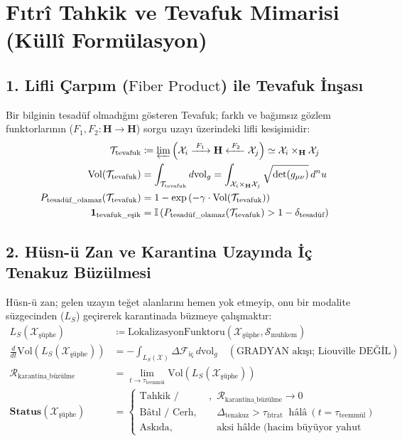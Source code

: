 \documentclass[11pt, a4paper]{article}
\begin{document}
\section{Fıtrî Tahkik ve Tevafuk Mimarisi (Küllî Formülasyon)}

\subsection{1. Lifli Çarpım ($\text{Fiber Product}$) ile Tevafuk İnşası}
Bir bilginin tesadüf olmadığını gösteren Tevafuk; farklı ve bağımsız gözlem funktorlarının ($F_1, F_2 : \mathbf{H} \to \mathbf{H}$) sorgu uzayı üzerindeki lifli kesişimidir:
\begin{align}
\mathcal{T}_{\text{tevafuk}} &\coloneqq \varprojlim \left( \mathcal{X}_i \xrightarrow{\;F_1\;} \mathbf{H} \xleftarrow{\;F_2\;} \mathcal{X}_j \right) \simeq \mathcal{X}_i \times_{\mathbf{H}} \mathcal{X}_j \\
\text{Vol}(\mathcal{T}_{\text{tevafuk}}) &= \int_{\mathcal{T}_{\text{tevafuk}}} d\text{vol}_g = \int_{\mathcal{X}_i \times_{\mathbf{H}} \mathcal{X}_j} \sqrt{\det(g_{\mu\nu})} \, d^n u \\
P_{\text{tesadüf\_olamaz}}(\mathcal{T}_{\text{tevafuk}}) &= 1 - \exp\left( -\gamma \cdot \text{Vol}(\mathcal{T}_{\text{tevafuk}}) \right) \\
\mathbf{1}_{\text{tevafuk\_eşik}} &= \mathbb{I}\left( P_{\text{tesadüf\_olamaz}}(\mathcal{T}_{\text{tevafuk}}) > 1 - \delta_{\text{tesadüf}} \right)
\end{align}

\subsection{2. Hüsn-ü Zan ve Karantina Uzayında İç Tenakuz Büzülmesi}
Hüsn-ü zan; gelen uzayın teğet alanlarını hemen yok etmeyip, onu bir modalite süzgecinden ($L_S$) geçirerek karantinada büzmeye çalışmaktır:
\begin{align}
L_S(\mathcal{X}_{\text{şüphe}}) &\coloneqq \text{LokalizasyonFunktoru}(\mathcal{X}_{\text{şüphe}}, \mathcal{S}_{\text{muhkem}}) \\
\frac{d}{dt} \text{Vol}(L_S(\mathcal{X}_{\text{şüphe}})) &= -\int_{L_S(\mathcal{X})} \Delta \mathcal{F}_{\text{iç}} \, d\text{vol}_g \quad (\text{GRADYAN akışı; Liouville DEĞİL}) \\
\mathcal{R}_{\text{karantina\_büzülme}} &= \lim_{t \to \tau_{\text{teemmül}}} \text{Vol}(L_S(\mathcal{X}_{\text{şüphe}})) \\
\mathbf{Status}(\mathcal{X}_{\text{şüphe}}) &= 
\begin{cases}
\text{Tahkik / Tasdik (noktaya büzülme)}, & \mathcal{R}_{\text{karantina\_büzülme}} \to 0 \\
\text{Bâtıl / Cerh}, & \Delta_{\text{tenakuz}} > \tau_{\text{fıtrat}} \ \text{ hâlâ} \ (t = \tau_{\text{teemmül}}) \\
\text{Askıda}, & \text{aksi hâlde (hacim büyüyor yahut sabit)}
\end{cases}
\end{align}
\end{document}
